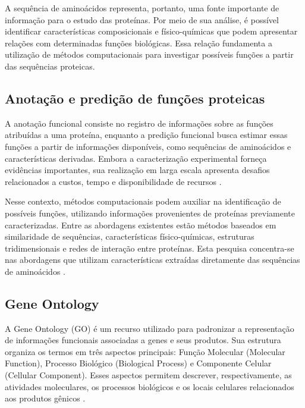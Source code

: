 A sequência de aminoácidos representa, portanto, uma fonte importante de informação para o estudo das proteínas. Por meio de sua análise, é possível identificar características composicionais e físico-químicas que podem apresentar relações com determinadas funções biológicas. Essa relação fundamenta a utilização de métodos computacionais para investigar possíveis funções a partir das sequências proteicas.


\subsection{Anotação e predição de funções proteicas}
\label{subsec:anotacao-predicao-funcional}

A anotação funcional consiste no registro de informações sobre as funções atribuídas a uma proteína, enquanto a predição funcional busca estimar essas funções a partir de informações disponíveis, como sequências de aminoácidos e características derivadas. Embora a caracterização experimental forneça evidências importantes, sua realização em larga escala apresenta desafios relacionados a custos, tempo e disponibilidade de recursos \cite{bonetta2020,makrodimitris2020}.

Nesse contexto, métodos computacionais podem auxiliar na identificação de possíveis funções, utilizando informações provenientes de proteínas previamente caracterizadas. Entre as abordagens existentes estão métodos baseados em similaridade de sequências, características físico-químicas, estruturas tridimensionais e redes de interação entre proteínas. Esta pesquisa concentra-se nas abordagens que utilizam características extraídas diretamente das sequências de aminoácidos \cite{lee2007,lin2024}.


\subsection{Gene Ontology}
\label{subsec:gene-ontology}

A Gene Ontology (GO) é um recurso utilizado para padronizar a representação de informações funcionais associadas a genes e seus produtos. Sua estrutura organiza os termos em três aspectos principais: Função Molecular (Molecular Function), Processo Biológico (Biological Process) e Componente Celular (Cellular Component). Esses aspectos permitem descrever, respectivamente, as atividades moleculares, os processos biológicos e os locais celulares relacionados aos produtos gênicos \cite{ashburner2000,goconsortium2021}.

